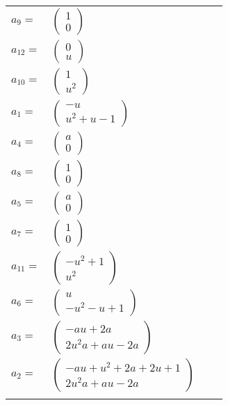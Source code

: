\documentclass[1p]{elsarticle_modified}
\theoremstyle{definition}
\begin{document}
\begin{tabular}{m{7pt} m{180pt} m{7pt} m{180pt} }
\flushright $a_{9}=$&$\begin{pmatrix}1\\0\end{pmatrix}$ \\
\flushright $a_{12}=$&$\begin{pmatrix}0\\u\end{pmatrix}$ \\
\flushright $a_{10}=$&$\begin{pmatrix}1\\u^2\end{pmatrix}$ \\
\flushright $a_{1}=$&$\begin{pmatrix}- u\\u^2+u-1\end{pmatrix}$ \\
\flushright $a_{4}=$&$\begin{pmatrix}a\\0\end{pmatrix}$ \\
\flushright $a_{8}=$&$\begin{pmatrix}1\\0\end{pmatrix}$ \\
\flushright $a_{5}=$&$\begin{pmatrix}a\\0\end{pmatrix}$ \\
\flushright $a_{7}=$&$\begin{pmatrix}1\\0\end{pmatrix}$ \\
\flushright $a_{11}=$&$\begin{pmatrix}- u^2+1\\u^2\end{pmatrix}$ \\
\flushright $a_{6}=$&$\begin{pmatrix}u\\- u^2- u+1\end{pmatrix}$ \\
\flushright $a_{3}=$&$\begin{pmatrix}- a u+2 a\\2 u^2 a+a u-2 a\end{pmatrix}$ \\
\flushright $a_{2}=$&$\begin{pmatrix}- a u+u^2+2 a+2 u+1\\2 u^2 a+a u-2 a\end{pmatrix}$\\&\end{tabular}
\end{document}
